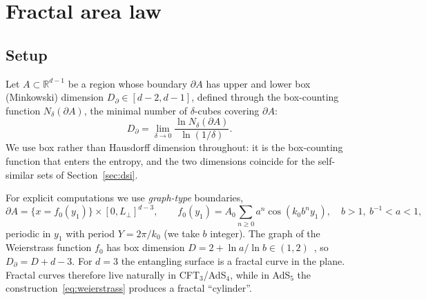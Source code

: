 \documentclass[11pt]{article}
\theoremstyle{definition}\newtheorem{definition}{Definition}[section]
\theoremstyle{remark}\newtheorem*{remark}{Remark}
\newcommand{\RR}{\mathbb{R}}
\begin{document}
\section{Fractal area law}
\label{sec:arealaw}

\subsection{Setup}
Let $A\subset\RR^{d-1}$ be a region whose boundary $\partial A$ has upper and lower box (Minkowski) dimension
$D_\partial\in[d-2,d-1]$, defined through the box-counting function $N_\delta(\partial A)$, the minimal number
of $\delta$-cubes covering $\partial A$:
\begin{equation}
D_\partial=\lim_{\delta\to0}\frac{\ln N_\delta(\partial A)}{\ln(1/\delta)}.
\end{equation}
We use box rather than Hausdorff dimension throughout: it is the box-counting function that enters the
entropy, and the two dimensions coincide for the self-similar sets of Section~\ref{sec:dsi}.

For explicit computations we use \emph{graph-type} boundaries,
\begin{equation}
\partial A=\{x=f_0(y_1)\}\times[0,L_\perp]^{d-3},\qquad
f_0(y_1)=A_0\sum_{n\ge0}a^n\cos(k_0b^ny_1),\quad b>1,\ b^{-1}<a<1,
\label{eq:weierstrass}
\end{equation}
periodic in $y_1$ with period $Y=2\pi/k_0$ (we take $b$ integer). The graph of the Weierstrass function $f_0$
has box dimension $D=2+\ln a/\ln b\in(1,2)$~\cite{Falconer}, so $D_\partial=D+d-3$. For $d=3$ the entangling
surface is a fractal curve in the plane. Fractal curves therefore live naturally in CFT$_3$/AdS$_4$, while in
AdS$_5$ the construction~\eqref{eq:weierstrass} produces a fractal ``cylinder''.
\end{document}
